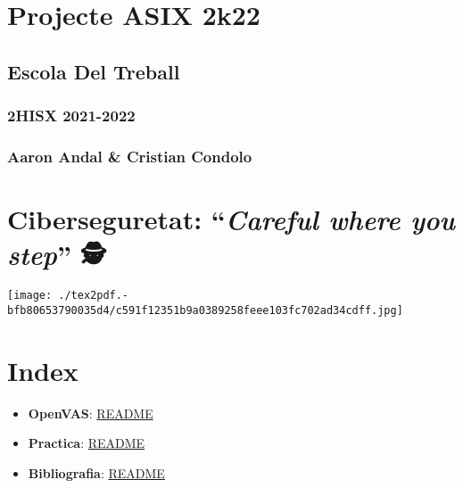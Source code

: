 \documentclass[]{article}
\date{}
\begin{document}
\hypertarget{projecte-asix-2k22}{%
\section{\texorpdfstring{\textbf{Projecte ASIX
2k22}}{Projecte ASIX 2k22}}\label{projecte-asix-2k22}}

\hypertarget{escola-del-treball}{%
\subsection{\texorpdfstring{\textbf{Escola Del
Treball}}{Escola Del Treball}}\label{escola-del-treball}}

\hypertarget{hisx-2021-2022}{%
\subsubsection{\texorpdfstring{\textbf{2HISX
2021-2022}}{2HISX 2021-2022}}\label{hisx-2021-2022}}

\hypertarget{aaron-andal-cristian-condolo}{%
\subsubsection{\texorpdfstring{\textbf{Aaron Andal \& Cristian
Condolo}}{Aaron Andal \& Cristian Condolo}}\label{aaron-andal-cristian-condolo}}

\hypertarget{ciberseguretat-careful-where-you-step-uxfe0f}{%
\section{\texorpdfstring{\textbf{Ciberseguretat}: ``\emph{Careful where
you step}'' 🕵️
🔎}{Ciberseguretat: ``Careful where you step'' 🕵️ 🔎}}\label{ciberseguretat-careful-where-you-step-uxfe0f}}

\texttt{[image: ./tex2pdf.-bfb80653790035d4/c591f12351b9a0389258feee103fc702ad34cdff.jpg]}

\hypertarget{index}{%
\section{Index}\label{index}}

\begin{itemize}
\item
  \textbf{OpenVAS}: \protect\hyperlink{descripciuxf3biografia}{README}
\item
  \textbf{Practica}: \protect\hyperlink{practica}{README}
\item
  \textbf{Bibliografia}: \protect\hyperlink{bibliografia}{README}
\end{itemize}
\end{document}
